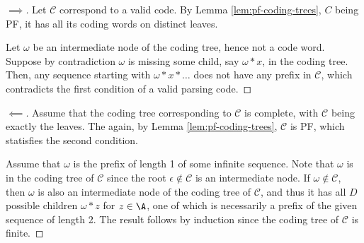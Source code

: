 \documentclass[toc]{../cs-classes/cs-classes}
\begin{document}
\begin{proof}[$\implies$]
    Let $\mathcal{C}$ correspond to a valid code. By Lemma \ref{lem:pf-coding-trees}, $C$ being PF, it has all its coding words on distinct leaves. 
    
    Let $\omega$ be an intermediate node of the coding tree, hence not a code word. Suppose by contradiction $\omega$ is missing some child, say $\omega*x$, in the coding tree. Then, any sequence starting with $\omega*x*\dots$ does not have any prefix in $\mathcal{C}$, which contradicts the first condition of a valid parsing code.
\end{proof}

\begin{proof}[$\impliedby$]
    Assume that the coding tree corresponding to $\mathcal{C}$ is complete, with $\mathcal{C}$ being exactly the leaves. The again, by Lemma \ref{lem:pf-coding-trees}, $\mathcal{C}$ is PF, which statisfies the second condition.

    Assume that $\omega$ is the prefix of length 1 of some infinite sequence. Note that $\omega$ is in the coding tree of $\mathcal{C}$ since the root $\epsilon\notin\mathcal{C}$ is an intermediate node. If $\omega\notin\mathcal{C}$, then $\omega$ is also an intermediate node of the coding tree of $\mathcal{C}$, and thus it has all $D$ possible children $\omega*z$ for $z\in\A$, one of which is necessarily a prefix of the given sequence of length 2. The result follows by induction since the coding tree of $\mathcal{C}$ is finite.
\end{proof}
\end{document}
